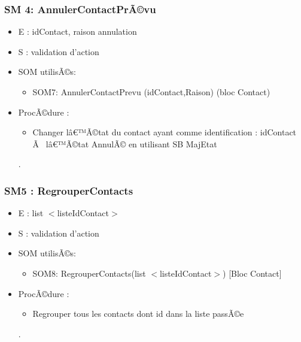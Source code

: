 \subsubsection{SM 4: AnnulerContactPrÃ©vu}
\begin{itemize}
\item E : idContact, raison annulation
\item S : validation d'action
\item SOM utilisÃ©s: 	
\begin{itemize}		
\item SOM7: AnnulerContactPrevu (idContact,Raison) (bloc Contact)	
\end{itemize}		
\item ProcÃ©dure : 	
\begin{itemize}		
\item Changer lâ€™Ã©tat du contact ayant comme identification : idContact Ã  lâ€™Ã©tat AnnulÃ© en utilisant SB MajEtat
\end{itemize}.
\end{itemize}
\subsubsection{SM5 : RegrouperContacts}
\begin{itemize}
\item E : list $<$listeIdContact$>$
\item S : validation d'action
\item SOM utilisÃ©s: 	
\begin{itemize}		
\item SOM8: RegrouperContacts(list $<$listeIdContact$>$) [Bloc Contact]		
\end{itemize}	
\item ProcÃ©dure : 	
\begin{itemize}		
\item Regrouper tous les contacts dont id dans la liste passÃ©e
\end{itemize}.
\end{itemize}

